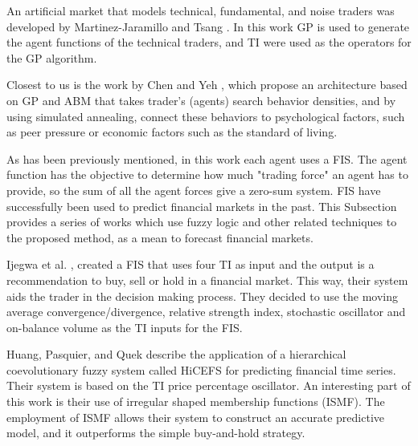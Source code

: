 \documentclass[a4paper,twoside]{article}
\begin{document}
An artificial market that models technical, fundamental, and noise
traders was developed by Martinez-Jaramillo and Tsang
\cite{Martinez-Jaramillo2009}. In this work GP is used to generate the
agent functions \cite{russell2003artificial} of the technical traders,
and TI were used as the operators for the GP algorithm. 

Closest to us is the work by Chen and Yeh \cite{Chen2001}, which
propose an architecture based on GP and ABM that takes trader's
(agents) search behavior densities, and by using simulated annealing,
connect these behaviors to psychological factors, such as peer
pressure or economic factors such as the standard of living. 



As has been previously mentioned, in this work each agent uses a FIS. The agent function has the objective to
determine how much "trading force" an agent has to provide, so the sum
of all the agent forces give a zero-sum system. FIS have successfully
been used to predict financial markets in the past. This Subsection
provides a series of works which use fuzzy logic and other related
techniques to the proposed method, as a mean to forecast financial
markets. 

Ijegwa et al. \cite{Ijegwa2014}, created a FIS that uses four TI as
input and the output is a recommendation to buy, sell or hold in a
financial market. This way, their system aids the trader in the
decision making process. They decided to use the moving average
convergence/divergence, relative strength index, stochastic oscillator
and on-balance volume as the TI inputs for the FIS. 

Huang, Pasquier, and Quek \cite{Huang2009} describe the application of
a hierarchical coevolutionary fuzzy system called HiCEFS for
predicting financial time series. Their system is based on the TI
price percentage oscillator. An interesting part of this work is their
use of irregular shaped membership functions (ISMF). The employment of
ISMF allows their system to construct an accurate predictive model,
and it outperforms the simple buy-and-hold strategy. 
\end{document}
